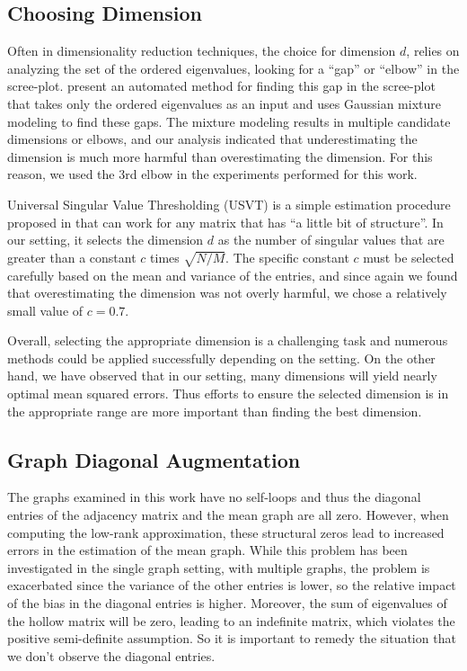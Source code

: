 \documentclass[10pt,letterpaper]{article}
\begin{document}
\subsection{Choosing Dimension}
\label{section:dim_select}
Often in dimensionality reduction techniques, the choice for dimension $d$, relies on analyzing the set of the ordered eigenvalues, looking for a ``gap'' or ``elbow'' in the scree-plot. \citet{zhu2006automatic} present an automated method for finding this gap in the scree-plot that takes only the ordered eigenvalues as an input and uses Gaussian mixture modeling to find these gaps.
The mixture modeling results in multiple candidate dimensions or elbows, and our analysis indicated that underestimating the dimension is much more harmful than overestimating the dimension.
For this reason, we used the 3rd elbow in the experiments performed for this work.

Universal Singular Value Thresholding (USVT) is a simple estimation procedure proposed in \citet{chatterjee2015matrix} that can work for any matrix that has ``a little bit of structure''. 
In our setting, it selects the dimension $d$ as the number of singular values that are greater than a constant $c$ times $\sqrt{N/M}$.
The specific constant $c$ must be selected carefully based on the mean and variance of the entries, and since again we found that overestimating the dimension was not overly harmful, we chose a relatively small value of $c=0.7$.

Overall, selecting the appropriate dimension is a challenging task and numerous methods could be applied successfully depending on the setting.
On the other hand, we have observed that in our setting, many dimensions will yield nearly optimal mean squared errors. 
Thus efforts to ensure the selected dimension is in the appropriate range are more important than finding the best dimension.



\subsection{Graph Diagonal Augmentation}
\label{section:diag_aug}
The graphs examined in this work have no self-loops and thus the diagonal entries of the adjacency matrix and the mean graph are all zero.
However, when computing the low-rank approximation, these structural zeros lead to increased errors in the estimation of the mean graph. 
While this problem has been investigated in the single graph setting, with multiple graphs, the problem is exacerbated since the variance of the other entries is lower, so the relative impact of the bias in the diagonal entries is higher.
Moreover, the sum of eigenvalues of the hollow matrix will be zero, leading to an indefinite matrix, which violates the positive semi-definite assumption. So it is important to remedy the situation that we don't observe the diagonal entries.
\end{document}
